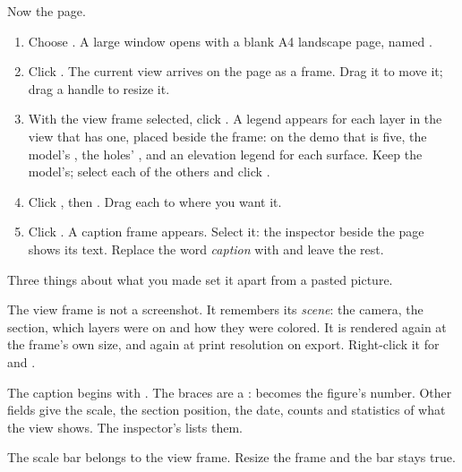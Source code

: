 Now the page.

\begin{tryit}
\begin{enumerate}
\item Choose . A large window opens with a blank A4 landscape page, named .
\item Click . The current view arrives on the page as a frame. Drag it to move it; drag a handle to resize it.
\item With the view frame selected, click . A legend appears for each layer in the view that has one, placed beside the frame: on the demo that is five, the model's , the holes' , and an elevation legend for each surface. Keep the model's; select each of the others and click .
\item Click , then . Drag each to where you want it.
\item Click . A caption frame appears. Select it: the inspector beside the page shows its text. Replace the word \emph{caption} with  and leave the rest.
\end{enumerate}
\end{tryit}


Three things about what you made set it apart from a pasted picture.

The view frame is not a screenshot. It remembers its \emph{scene}: the camera, the section, which layers were on and how they were colored. It is rendered again at the frame's own size, and again at print resolution on export. Right-click it for  and .

The caption begins with . The braces are a :  becomes the figure's number. Other fields give the scale, the section position, the date, counts and statistics of what the view shows. The inspector's  lists them.

The scale bar belongs to the view frame. Resize the frame and the bar stays true.

